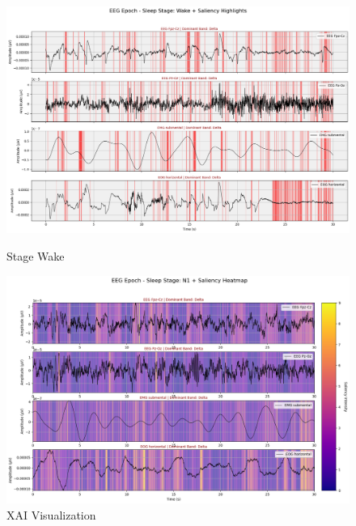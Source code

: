 \begin{figure}[htbp]
	\centering
	\begin{minipage}[b]{0.45\linewidth}
		\includegraphics[width=\linewidth]{"img/paper_3/stage wake"}
		\caption{Stage Wake}
		\label{fig:stage-wake}
	\end{minipage}
	\hfill
	\begin{minipage}[b]{0.45\linewidth}
		\includegraphics[width=\linewidth]{img/paper_3/XAI4}
		\caption{XAI Visualization}
		\label{fig:xai4}
	\end{minipage}
\end{figure}











































